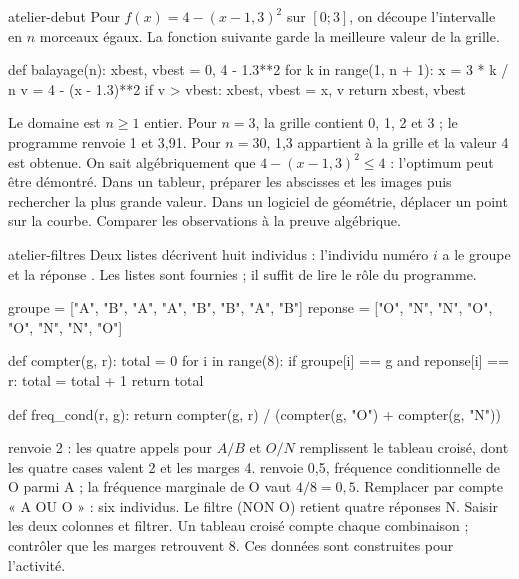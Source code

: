 \begin{blocEdition}{atelier-debut}
Pour $f(x)=4-(x-1{,}3)^2$ sur $[0;3]$, on découpe l’intervalle en $n$ morceaux égaux. La fonction suivante garde la meilleure valeur de la grille.
\begin{python}
def balayage(n):
    xbest, vbest = 0, 4 - 1.3**2
    for k in range(1, n + 1):
        x = 3 * k / n
        v = 4 - (x - 1.3)**2
        if v > vbest:
            xbest, vbest = x, v
    return xbest, vbest
\end{python}
Le domaine est $n\ge1$ entier. Pour $n=3$, la grille contient 0, 1, 2 et 3 ; le programme renvoie 1 et 3,91. Pour $n=30$, 1,3 appartient à la grille et la valeur 4 est obtenue. On sait algébriquement que $4-(x-1{,}3)^2\le4$ : l’optimum peut être démontré.
Dans un tableur, préparer les abscisses et les images puis rechercher la plus grande valeur. Dans un logiciel de géométrie, déplacer un point sur la courbe. Comparer les observations à la preuve algébrique.
\end{blocEdition}
\begin{blocEdition}{atelier-filtres}
Deux listes décrivent huit individus : l’individu numéro $i$ a le groupe  et la réponse . Les listes sont fournies ; il suffit de lire le rôle du programme.
\begin{python}
groupe  = ["A", "B", "A", "A", "B", "B", "A", "B"]
reponse = ["O", "N", "N", "O", "O", "N", "N", "O"]

def compter(g, r):
    total = 0
    for i in range(8):
        if groupe[i] == g and reponse[i] == r:
            total = total + 1
    return total

def freq_cond(r, g):
    return compter(g, r) / (compter(g, "O") + compter(g, "N"))
\end{python}
 renvoie 2 : les quatre appels pour $A/B$ et $O/N$ remplissent le tableau croisé, dont les quatre cases valent 2 et les marges 4.  renvoie 0,5, fréquence conditionnelle de O parmi A ; la fréquence marginale de O vaut $4/8=0{,}5$. Remplacer  par  compte « A OU O » : six individus. Le filtre  (NON O) retient quatre réponses N.
Saisir les deux colonnes et filtrer. Un tableau croisé compte chaque combinaison ; contrôler que les marges retrouvent 8. Ces données sont construites pour l’activité.
\end{blocEdition}
